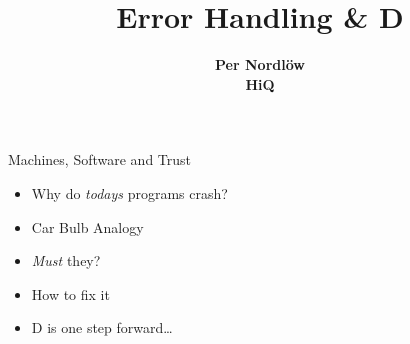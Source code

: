 \documentclass[xcolor=dvipsnames]{beamer}
\title[Error Handling \& D]{Error Handling \& D}
\author[Per Nordlöw, HiQ]{\textbf {Per Nordlöw\\HiQ}} %
\begin{document}
\begin{frame}[fragile]
  \begin{figure}
  \end{figure}
  \maketitle
\end{frame}


\begin{frame}[fragile]{Machines, Software and Trust}
  \begin{figure}
  \end{figure}
  \begin{itemize}[<+->]
  \item Why do \textit{todays} programs crash?
  \item Car Bulb Analogy
  \item \emph{Must} they?
  \item How to fix it
  \item D is one step forward\ldots
  \end{itemize}
\end{frame}
\end{document}
